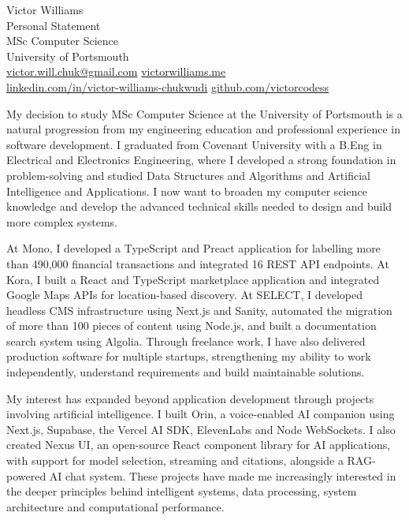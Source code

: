 \documentclass[11pt,a4paper]{article}
\begin{document}
\begin{center}
{\Large Victor Williams}\\[0.4em]
Personal Statement\\[0.15em]
MSc Computer Science\\
University of Portsmouth\\[0.4em]
{\small
\href{mailto:victor.will.chuk@gmail.com}{victor.will.chuk@gmail.com}
\quad
\href{https://www.victorwilliams.me/}{victorwilliams.me}\\[0.15em]
\href{https://www.linkedin.com/in/victor-williams-chukwudi/}{linkedin.com/in/victor-williams-chukwudi}
\quad
\href{https://github.com/victorcodess}{github.com/victorcodess}
}
\end{center}

\vspace{0.2em}

My decision to study MSc Computer Science at the University of Portsmouth is a natural progression from my engineering education and professional experience in software development. I graduated from Covenant University with a B.Eng in Electrical and Electronics Engineering, where I developed a strong foundation in problem-solving and studied Data Structures and Algorithms and Artificial Intelligence and Applications. I now want to broaden my computer science knowledge and develop the advanced technical skills needed to design and build more complex systems.

At Mono, I developed a TypeScript and Preact application for labelling more than 490,000 financial transactions and integrated 16 REST API endpoints. At Kora, I built a React and TypeScript marketplace application and integrated Google Maps APIs for location-based discovery. At SELECT, I developed headless CMS infrastructure using Next.js and Sanity, automated the migration of more than 100 pieces of content using Node.js, and built a documentation search system using Algolia. Through freelance work, I have also delivered production software for multiple startups, strengthening my ability to work independently, understand requirements and build maintainable solutions.

My interest has expanded beyond application development through projects involving artificial intelligence. I built Orin, a voice-enabled AI companion using Next.js, Supabase, the Vercel AI SDK, ElevenLabs and Node WebSockets. I also created Nexus UI, an open-source React component library for AI applications, with support for model selection, streaming and citations, alongside a RAG-powered AI chat system. These projects have made me increasingly interested in the deeper principles behind intelligent systems, data processing, system architecture and computational performance.
\end{document}
